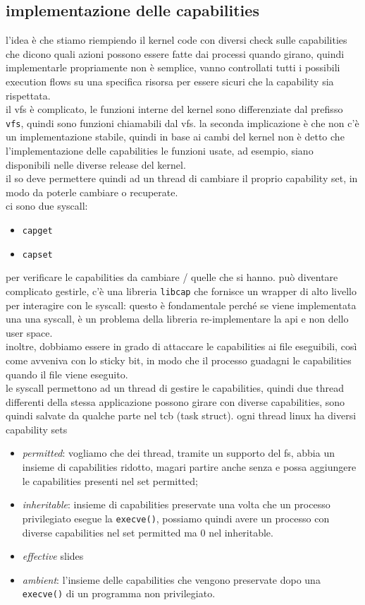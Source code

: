 \documentclass[12pt, oneside]{extbook} %
\begin{document}
\subsection{implementazione delle capabilities}
l'idea è che stiamo riempiendo il kernel code con diversi check sulle capabilities che dicono quali azioni possono essere fatte dai processi quando girano, quindi implementarle propriamente non è semplice, vanno controllati tutti i possibili execution flows su una specifica risorsa per essere sicuri che la capability sia rispettata.\\il vfs è complicato, le funzioni interne del kernel sono differenziate dal prefisso \texttt{vfs}, quindi sono funzioni chiamabili dal vfs. la seconda implicazione è che non c'è un implementazione stabile, quindi in base ai cambi del kernel non è detto che l'implementazione delle capabilities le funzioni usate, ad esempio, siano disponibili nelle diverse release del kernel.\\il so deve permettere quindi ad un thread di cambiare il proprio capability set, in modo da poterle cambiare o recuperate.\\ci sono due syscall:
\begin{itemize}
\item \texttt{capget}
\item \texttt{capset}
\end{itemize}
per verificare le capabilities da cambiare / quelle che si hanno. può diventare complicato gestirle, c'è una libreria \texttt{libcap} che fornisce un wrapper di alto livello per interagire con le syscall: questo è fondamentale perché se viene implementata una una syscall, è un problema della libreria re-implementare la api e non dello user space.\\inoltre, dobbiamo essere in grado di attaccare le capabilities ai file eseguibili, così come avveniva con lo sticky bit, in modo che il processo guadagni le capabilities quando il file viene eseguito.\\le syscall permettono ad un thread di gestire le capabilities, quindi due thread differenti della stessa applicazione possono girare con diverse capabilities, sono quindi salvate da qualche parte nel tcb (task struct). ogni thread linux ha diversi capability sets
\begin{itemize}
\item \textit{permitted}: vogliamo che dei thread, tramite un supporto del fs, abbia un insieme di capabilities ridotto, magari partire anche senza e possa aggiungere le capabilities presenti nel set permitted;
\item \textit{inheritable}: insieme di capabilities preservate una volta che un processo privilegiato esegue la \texttt{execve()}, possiamo quindi avere un processo con diverse capabilities nel set permitted ma 0 nel inheritable.
\item \textit{effective} slides
\item \textit{ambient}: l'insieme delle capabilities che vengono preservate dopo una \texttt{execve()} di un programma non privilegiato. 
\end{itemize}
\end{document}
